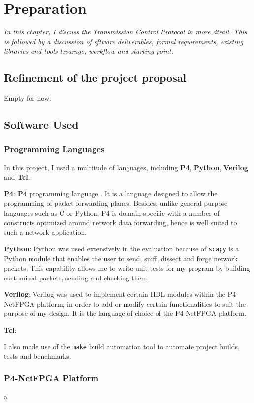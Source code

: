 \chapter{Preparation}
\textit{In this chapter, I discuss the Transmission Control Protocol in more dteail. This is followed by a discussion of sftware deliverables, formal requirements, existing libraries and tools levarage, workflow and starting point.
}

\section{Refinement of the project proposal}
Empty for now.

\section{Software Used}
	\subsection{Programming Languages}
	In this project, I used a multitude of languages, including \textbf{P4}, \textbf{Python}, \textbf{Verilog} and \textbf{Tcl}.
	
	\textbf{P4}: \textbf{P4} programming language \cite{p4.org}. It is a language designed to allow the programming of packet forwarding planes. Besides, unlike general purpose languages such as C or Python, P4 is domain-specific with a number of constructs optimized around network data forwarding, hence is well suited to such a network application.

	
	\textbf{Python}: Python was used extensively in the evaluation because of \texttt{scapy} is a Python module that enables the user to send, sniff, dissect and forge network packets. This capability allows me to write unit tests for my program by building customised packets, sending and checking them.
	
	\textbf{Verilog}: Verilog was used to implement certain HDL modules within the P4-NetFPGA platform, in order to add or modify certain functionalities to suit the purpose of my design. It is the language of choice of the P4-NetFPGA platform.
	
	\textbf{Tcl}:
	
	I also made use of the \texttt{make} build automation tool to automate project builds, tests and benchmarks.
	
	\subsection{P4-NetFPGA Platform}
	a
